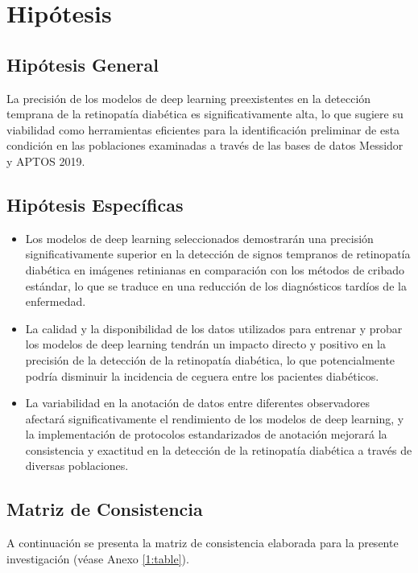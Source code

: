 \section{Hipótesis}

\subsection{Hipótesis General}
\newcommand{\HipotesisGeneral}{
	La precisión de los modelos de deep learning preexistentes en la detección temprana de la retinopatía diabética es significativamente alta, lo que sugiere su viabilidad como herramientas eficientes para la identificación preliminar de esta condición en las poblaciones examinadas a través de las bases de datos Messidor y APTOS 2019.
}
\HipotesisGeneral

\subsection{Hipótesis Específicas}
\newcommand{\Hone}{
	Los modelos de deep learning seleccionados demostrarán una precisión significativamente superior en la detección de signos tempranos de retinopatía diabética en imágenes retinianas en comparación con los métodos de cribado estándar, lo que se traduce en una reducción de los diagnósticos tardíos de la enfermedad.
}
\newcommand{\Htwo}{
	La calidad y la disponibilidad de los datos utilizados para entrenar y probar los modelos de deep learning tendrán un impacto directo y positivo en la precisión de la detección de la retinopatía diabética, lo que potencialmente podría disminuir la incidencia de ceguera entre los pacientes diabéticos.
}
\newcommand{\Hthree}{
	La variabilidad en la anotación de datos entre diferentes observadores afectará significativamente el rendimiento de los modelos de deep learning, y la implementación de protocolos estandarizados de anotación mejorará la consistencia y exactitud en la detección de la retinopatía diabética a través de diversas poblaciones.
}
\newcommand{\Hfour}{
	cv
}
\newcommand{\Hfive}{
	xws
}

\begin{itemize}
	\item \Hone
	\item \Htwo
	\item \Hthree
\end{itemize}

\subsection{Matriz de Consistencia}
A continuación se presenta la matriz de consistencia elaborada para la presente investigación (véase Anexo \ref{1:table}).
